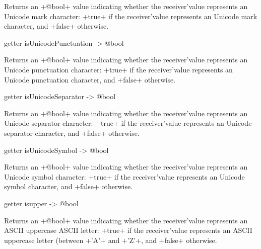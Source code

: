 Returns an \ggs+@bool+ value indicating whether the receiver'value represents an Unicode mark character: \ggs+true+ if the receiver'value represents an Unicode mark character, and \ggs+false+ otherwise.







\begin{galgas}
getter isUnicodePunctuation -> @bool
\end{galgas}

Returns an \ggs+@bool+ value indicating whether the receiver'value represents an Unicode punctuation character: \ggs+true+ if the receiver'value represents an Unicode punctuation character, and \ggs+false+ otherwise.







\begin{galgas}
getter isUnicodeSeparator -> @bool
\end{galgas}

Returns an \ggs+@bool+ value indicating whether the receiver'value represents an Unicode separator character: \ggs+true+ if the receiver'value represents an Unicode separator character, and \ggs+false+ otherwise.







\begin{galgas}
getter isUnicodeSymbol -> @bool
\end{galgas}

Returns an \ggs+@bool+ value indicating whether the receiver'value represents an Unicode symbol character: \ggs+true+ if the receiver'value represents an Unicode symbol character, and \ggs+false+ otherwise.










\begin{galgas}
getter isupper -> @bool
\end{galgas}

Returns an \ggs+@bool+ value indicating whether the receiver'value represents an ASCII uppercase ASCII letter: \ggs+true+ if the receiver'value represents an ASCII uppercase letter (between \ggs+'A'+ and \ggs+'Z'+, and \ggs+false+ otherwise.






